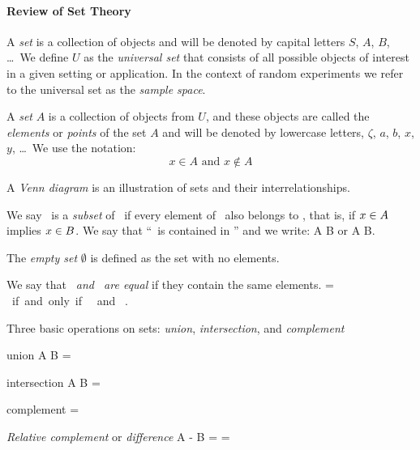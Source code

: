 \eit

\paragraph{Review of Set Theory}

\bit
	\item A \emph{set} is a collection of objects and will be denoted by capital
	letters $S$, $A$, $B$, \ldots\ We define $U$ as the \emph{universal set}
	that consists of all possible objects of interest in a given setting or application.
	In the context of random experiments we refer to the universal set as
	the \emph{sample space}.


	\item A \emph{set} $A$ is a collection of objects from $U$,
	and these objects are called the \emph{elements} or \emph{points} of the set $A$
	and will be denoted by lowercase letters, $\zeta$, $a$, $b$, $x$, $y$, \ldots\
	We use the notation:
	\[
		x \in A \mbox{ and } x \notin A
	\]

	\item A \emph{Venn diagram} is an illustration of sets and their interrelationships.


	\item We say \sA\ is a \emph{subset} of \sB\ if every element of \sA\ also belongs to \sB,
	that is, if $x\in A$ implies $x\in B$.
	We say that ``\sA\ is contained in \sB'' and we write:
	\beq A \subset B \eeq
	or
	\beq A \subseteq B. \eeq

	\item The \emph{empty set} $\emptyset$ is defined as the set with no elements.

	\item We say that \emph{\sA\ and \sB\ are equal} if they contain the same elements.
	\beq
		\sA = \sB \mbox{ if and only if } \sA \subset \sB \mbox{ and } \sB \subset \sA.
	\eeq

	\item Three basic operations on sets: \emph{union}, \emph{intersection}, and \emph{complement}
	\bit
		\item union
			\beq A \cup B = \eeq

		\item intersection
			\beq A \cap B = \eeq

		\item complement
			\beq {} =  \eeq
	\eit

	\item \emph{Relative complement} or \emph{difference}
	\beq
		A - B =  = 
	\eeq

